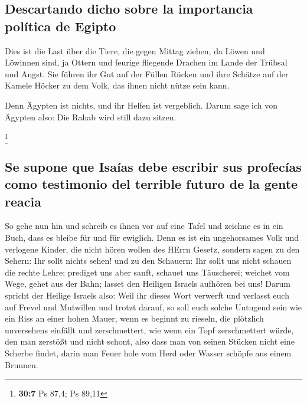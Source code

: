 \hypertarget{descartando-dicho-sobre-la-importancia-poluxedtica-de-egipto}{%
\subsection{Descartando dicho sobre la importancia política de
Egipto}\label{descartando-dicho-sobre-la-importancia-poluxedtica-de-egipto}}

 Dies ist die Last über die Tiere, die gegen Mittag
ziehen, da Löwen und Löwinnen sind, ja Ottern und feurige fliegende
Drachen im Lande der Trübsal und Angst. Sie führen ihr Gut auf der
Füllen Rücken und ihre Schätze auf der Kamele Höcker zu dem Volk, das
ihnen nicht nütze sein kann.

 Denn Ägypten ist nichts, und ihr Helfen ist vergeblich.
Darum sage ich von Ägypten also: Die Rahab wird still dazu sitzen.

\footnote{\textbf{30:7} Ps 87,4; Ps 89,11}

\hypertarget{se-supone-que-isauxedas-debe-escribir-sus-profecuxedas-como-testimonio-del-terrible-futuro-de-la-gente-reacia}{%
\subsection{Se supone que Isaías debe escribir sus profecías como
testimonio del terrible futuro de la gente
reacia}\label{se-supone-que-isauxedas-debe-escribir-sus-profecuxedas-como-testimonio-del-terrible-futuro-de-la-gente-reacia}}

 So gehe nun hin und schreib es ihnen vor auf eine Tafel
und zeichne es in ein Buch, dass es bleibe für und für ewiglich.
 Denn es ist ein ungehorsames Volk und verlogene Kinder,
die nicht hören wollen des HErrn Gesetz,  sondern sagen
zu den Sehern: Ihr sollt nichts sehen! und zu den Schauern: Ihr sollt
uns nicht schauen die rechte Lehre; prediget uns aber sanft, schauet uns
Täuscherei;  weichet vom Wege, gehet aus der Bahn; lasset
den Heiligen Israels aufhören bei uns!  Darum spricht der
Heilige Israels also: Weil ihr dieses Wort verwerft und verlasst euch
auf Frevel und Mutwillen und trotzt darauf,  so soll euch
solche Untugend sein wie ein Riss an einer hohen Mauer, wenn es beginnt
zu rieseln, die plötzlich unversehens einfällt und zerschmettert,
 wie wenn ein Topf zerschmettert würde, den man zerstößt
und nicht schont, also dass man von seinen Stücken nicht eine Scherbe
findet, darin man Feuer hole vom Herd oder Wasser schöpfe aus einem
Brunnen.

